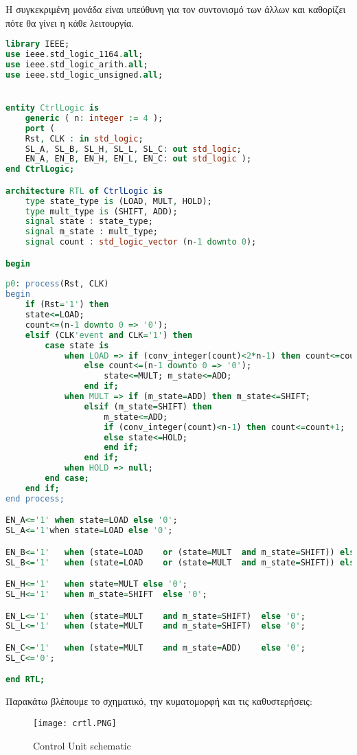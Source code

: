 \documentclass{article}
\begin{document}
Η συγκεκριμένη μονάδα είναι υπεύθυνη για τον συντονισμό των άλλων και καθορίζει πότε θα γίνει η κάθε λειτουργία.

\begin{otherlanguage}{english}
\begin{lstlisting}[language=VHDL, caption= Control Unit VHDL Code]
library IEEE;
use ieee.std_logic_1164.all;
use ieee.std_logic_arith.all;
use ieee.std_logic_unsigned.all;


entity CtrlLogic is
	generic ( n: integer := 4 );
	port (
	Rst, CLK : in std_logic;
	SL_A, SL_B, SL_H, SL_L, SL_C: out std_logic;
	EN_A, EN_B, EN_H, EN_L, EN_C: out std_logic );
end CtrlLogic;

architecture RTL of CtrlLogic is
	type state_type is (LOAD, MULT, HOLD);
	type mult_type is (SHIFT, ADD);
	signal state : state_type;
	signal m_state : mult_type;
	signal count : std_logic_vector (n-1 downto 0);

begin
	
p0: process(Rst, CLK)
begin
	if (Rst='1') then
	state<=LOAD;
	count<=(n-1 downto 0 => '0');
	elsif (CLK'event and CLK='1') then
		case state is
			when LOAD => if (conv_integer(count)<2*n-1) then count<=count+1;
				else count<=(n-1 downto 0 => '0');
					state<=MULT; m_state<=ADD;
				end if;
			when MULT => if (m_state=ADD) then m_state<=SHIFT;
				elsif (m_state=SHIFT) then
					m_state<=ADD;
					if (conv_integer(count)<n-1) then count<=count+1;
					else state<=HOLD;
					end if;
				end if;
			when HOLD => null;
		end case;
	end if;
end process;

EN_A<='1' when state=LOAD else '0';
SL_A<='1'when state=LOAD else '0';

EN_B<='1'	when (state=LOAD	or (state=MULT	and m_state=SHIFT))	else '0';
SL_B<='1'	when (state=LOAD	or (state=MULT	and m_state=SHIFT))	else '0';	

EN_H<='1'	when state=MULT	else '0';
SL_H<='1'	when m_state=SHIFT	else '0';	

EN_L<='1'	when (state=MULT	and m_state=SHIFT)	else '0';
SL_L<='1'	when (state=MULT	and m_state=SHIFT)	else '0';

EN_C<='1'	when (state=MULT	and m_state=ADD)	else '0';
SL_C<='0';

end RTL;
\end{lstlisting}
\end{otherlanguage}

Παρακάτω βλέπουμε το σχηματικό, την κυματομορφή και τις καθυστερήσεις:

\begin{figure}[h!]
  \caption{\foreignlanguage{english}{Control Unit schematic}}
\texttt{[image: crtl.PNG]} 
\end{figure}
\end{document}
